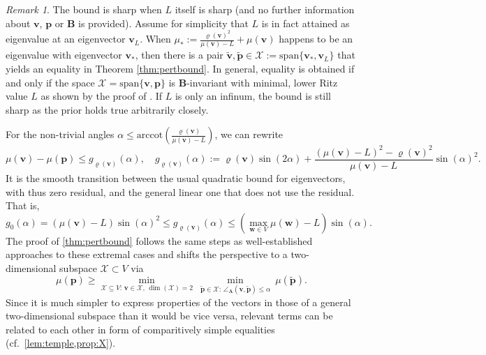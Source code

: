 \documentclass[a4paper,11pt,oneside]{amsart}
\theoremstyle{definition}
\theoremstyle{remark}
\newtheorem{remark}[theorem]{Remark}
\newcommand{\ten}[1]{\boldsymbol{#1}}
\numberwithin{equation}{section}
\numberwithin{theorem}{section}
\begin{document}
\begin{appendix}
\begin{remark}
The bound is sharp when $L$ itself is sharp (and no further information about $\ten v$, $\ten p$ or $\ten B$ is provided). Assume for simplicity that $L$ is in fact attained as eigenvalue at an eigenvector $\ten v_L$.
%
When $\mu_\ast := \frac{\varrho(\ten v)^2}{\mu(\ten v) - L} + \mu(\ten v)$ happens to be an eigenvalue with eigenvector $\ten v_\ast$, then there is a pair $\ten{\tilde v}, \ten{\tilde p} \in \mathcal{X} := \mathrm{span}\{\ten v_\ast,\ten v_L\}$ that yields an equality in Theorem \ref{thm:pertbound}.
In general, equality is obtained if and only if the space $\mathcal{X} = \mathrm{span}\{\ten v,\ten p\}$ is $\ten B$-invariant with minimal, lower Ritz value $L$ as shown by the proof of . If $L$ is only an infinum, the bound is still sharp as the prior holds true arbitrarily closely.
\end{remark}%
%
For the non-trivial angles $\alpha \leq \mathrm{arccot} \left( \frac{\varrho(\ten v)}{\mu(\ten v) - L} \right)$, we can rewrite
\begin{equation*}
  \mu(\ten v) - \mu(\ten p) \leq g_{\varrho(\ten v)}(\alpha), \quad g_{\varrho(\ten v)}(\alpha) := \varrho(\ten v) \sin(2 \alpha) + \frac{(\mu(\ten v) - L)^2 - \varrho(\ten v)^2}{\mu(\ten v) - L} \sin(\alpha)^2.
\end{equation*}
It is the smooth transition between the usual quadratic bound for eigenvectors, with thus zero residual, and the general linear one that does not use the residual. That is,
\begin{equation*}
 g_{0}(\alpha) = (\mu(\ten v) - L) \sin(\alpha)^2 \leq g_{\varrho(\ten v)}(\alpha) \leq (\max_{\ten w \in V} \mu(\ten w) - L) \sin(\alpha).
\end{equation*}
The proof of \cref{thm:pertbound} follows the same steps as well-established approaches to these extremal cases and shifts the perspective to a two-dimensional subspace $\mathcal{X} \subset V$ via
%
%
\begin{equation}\label{eq:vptoX}
 \mu(\ten p) \geq \min_{\mathcal{X} \subseteq V :\, \ten v \in \mathcal{X},\, \dim(\mathcal{X}) = 2} \  \min_{\ten{\tilde p} \in \mathcal{X} :\, \angle_{\ten A}(\ten v,\ten{\tilde p}) \leq \alpha}\ \mu(\ten{\tilde p}).
%
%
\end{equation}
Since it is much simpler to express properties of the vectors in those of a general two-dimensional subspace than it would be vice versa, relevant terms can be related to each other in form of comparitively simple equalities (cf.~\cref{lem:temple,prop:X}).

\end{appendix}
\end{document}

